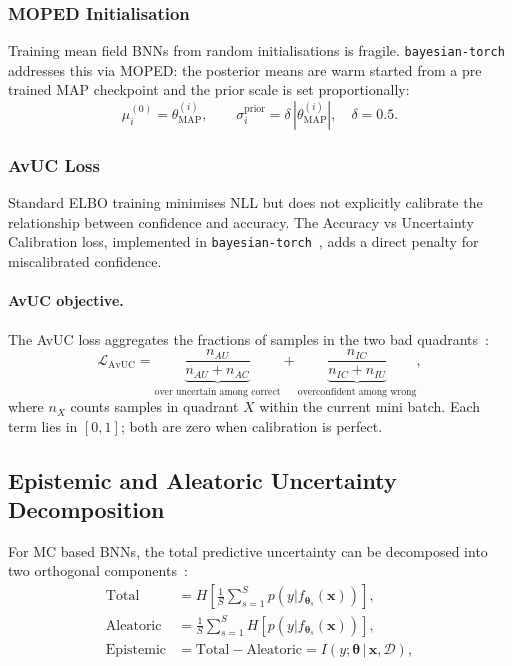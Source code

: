 \documentclass[12pt,a4paper]{article}
\newcommand{\btheta}{\bm{\theta}}
\newcommand{\cD}{\mathcal{D}}
\newcommand{\MAP}{\text{MAP}}
\begin{document}
\subsubsection{MOPED Initialisation}

Training mean field BNNs from random initialisations is fragile.
\texttt{bayesian-torch}~\citep{intel2021bayesiantorch} addresses this via
MOPED: the posterior means are warm started from a
pre trained MAP checkpoint and the prior scale is set proportionally:
\begin{equation}
  \mu_i^{(0)} = \theta_{\MAP}^{(i)}, \qquad
  \sigma_i^{\text{prior}} = \delta\,|\theta_{\MAP}^{(i)}|, \quad \delta=0.5.
\end{equation}

\subsubsection{AvUC Loss}
\label{sec:theory:avuc}

Standard ELBO training minimises NLL but does not explicitly calibrate the
relationship between confidence and accuracy.
The
Accuracy vs Uncertainty Calibration loss, implemented in
\texttt{bayesian-torch}~\citep{intel2021bayesiantorch}, adds a direct
penalty for miscalibrated confidence.

\paragraph{AvUC objective.}
The AvUC loss aggregates the fractions of samples in the two
bad quadrants~\citep{intel2021bayesiantorch}:
\begin{equation}
  \mathcal{L}_{\mathrm{AvUC}}
    = \underbrace{\frac{n_{AU}}{n_{AU}+n_{AC}}}_{\text{over uncertain among correct}}
    + \underbrace{\frac{n_{IC}}{n_{IC}+n_{IU}}}_{\text{overconfident among wrong}},
  \label{eq:avuc}
\end{equation}
where $n_X$ counts samples in quadrant $X$ within the current mini batch.
Each term lies in $[0,1]$; both are zero when calibration is perfect.

\subsection{Epistemic and Aleatoric Uncertainty Decomposition}
\label{sec:theory:unc_decomp}

For MC based BNNs, the total predictive uncertainty can be decomposed into
two orthogonal components~\citep{goan2020bayesian}:
\begin{align}
  \text{Total}   &= H\!\left[\frac{1}{S}\sum_{s=1}^{S} p(y|f_{\btheta_s}(\bm{x}))\right], \\
  \text{Aleatoric}&= \frac{1}{S}\sum_{s=1}^{S} H\!\left[p(y|f_{\btheta_s}(\bm{x}))\right], \\
  \text{Epistemic}&= \text{Total} - \text{Aleatoric}
    = I\!\left(y;\btheta\,|\,\bm{x},\cD\right),
  \label{eq:mi}
\end{align}
\end{document}
